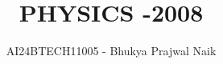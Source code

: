 \documentclass[journal]{IEEEtran}
\begin{document}

\vspace{3cm}

\title{PHYSICS -2008}
\author{AI24BTECH11005 - Bhukya Prajwal Naik
}
{\let\newpage\relax\maketitle}

\renewcommand{\thefigure}{\theenumi}
\renewcommand{\thetable}{\theenumi}
\setlength{\intextsep}{10pt} %


\renewcommand{\thetable}{\theenumi}
\end{document}
